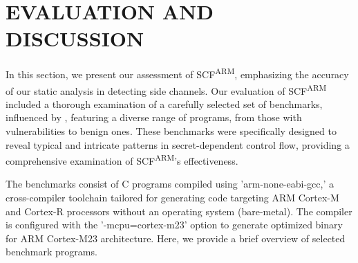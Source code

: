 \section{EVALUATION AND DISCUSSION}

In this section, we present our assessment of \ac{SCF}\textsuperscript{ARM}, emphasizing the accuracy of our static analysis in detecting side channels. Our evaluation of \ac{SCF}\textsuperscript{ARM} included a thorough examination of a carefully selected set of benchmarks, influenced by \cite{hans}, featuring a diverse range of programs, from those with vulnerabilities to benign ones. These benchmarks were specifically designed to reveal typical and intricate patterns in secret-dependent control flow, providing a comprehensive examination of \ac{SCF}\textsuperscript{ARM}'s effectiveness. 

The benchmarks consist of C programs compiled using 'arm-none-eabi-gcc,' a cross-compiler toolchain tailored for generating code targeting ARM Cortex-M and Cortex-R processors without an operating system (bare-metal). The compiler is configured with the '-mcpu=cortex-m23' option to generate optimized binary for ARM Cortex-M23 architecture. Here, we provide a brief overview of selected benchmark programs. 

